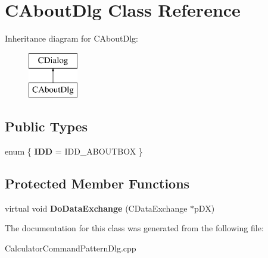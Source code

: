 \hypertarget{class_c_about_dlg}{}\section{C\+About\+Dlg Class Reference}
\label{class_c_about_dlg}
Inheritance diagram for C\+About\+Dlg\+:\begin{figure}[H]
\begin{center}
\leavevmode
\includegraphics[height=2.000000cm]{class_c_about_dlg}
\end{center}
\end{figure}
\subsection*{Public Types}
\begin{DoxyCompactItemize}
\item 
\hypertarget{class_c_about_dlg_a27a5d4c47f16acb8562522fcd22871f7}{}enum \{ {\bfseries I\+D\+D} = I\+D\+D\+\_\+\+A\+B\+O\+U\+T\+B\+O\+X
 \}\label{class_c_about_dlg_a27a5d4c47f16acb8562522fcd22871f7}

\end{DoxyCompactItemize}
\subsection*{Protected Member Functions}
\begin{DoxyCompactItemize}
\item 
\hypertarget{class_c_about_dlg_ab83db7484fec957282d7d5a21aed4df4}{}virtual void {\bfseries Do\+Data\+Exchange} (C\+Data\+Exchange $\ast$p\+D\+X)\label{class_c_about_dlg_ab83db7484fec957282d7d5a21aed4df4}

\end{DoxyCompactItemize}


The documentation for this class was generated from the following file\+:\begin{DoxyCompactItemize}
\item 
Calculator\+Command\+Pattern\+Dlg.\+cpp\end{DoxyCompactItemize}
